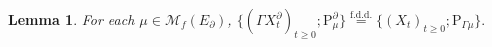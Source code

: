 \documentclass[12pt,a4paper]{amsart}
\numberwithin{equation}{section}
\theoremstyle{plain}
\newtheorem{lem}[thm]{Lemma}
\theoremstyle{definition}
\theoremstyle{remark}
\begin{document}
\begin{lem} \label{thm:T.1}
	For each $\mu \in \mathcal M_f(E_\partial)$,
$
	\{(\Gamma X^\partial_t)_{t\geq 0}; \mathrm P_\mu^\partial\} \overset{\text{f.d.d.}}= \{(X_t)_{t\geq 0}; \mathrm P_{\Gamma\mu}\}.
$
\end{lem}
\begin{comment}
\begin{proof}	
	Fix an arbitrary $\mu\in \mathcal M_f(E_\partial)$, $T\geq 0$, a finite measure $\lambda$ on $[0,T]$, and a bounded non-negative Borel function $f:(s,x)\mapsto f_s(x)$ on $[0,T]\times E$.
	According to \cite[Theorem 5.15]{Li2011Measure-valued}, we know that
\begin{equation} \label{eq:T.05}
\mathrm P_{r,\Gamma\mu}\Big[e^{-\int_{[r,T]} X_{s-r}(f_s)\lambda(\mathrm ds)  } \Big] = e^{-(\Gamma\mu)(u_r)}, \quad 0\leq r\leq T,
\end{equation}
	where $u:(s,x)\mapsto u_s(x)$ is the unique bounded non-negative solution on $[0,T]\times E$ of
\begin{equation} \label{eq:T.1}
	u_r(x) + \int_r^t \Pi_{r, x}\big[\psi\big(\xi_{s-r}, u_s(\xi_{s-r})\big)\mathbf 1_{\xi_{s-r}\in E}\big] \mathrm ds
	= \int_{[r,t]} \Pi_{r, x} \big[f_s(\xi_{s-r}) \mathbf 1_{\xi_{s-r} \in E}\big] \lambda(\mathrm ds).
\end{equation}
	Extend $f$ and $u$ as bounded non-negative functions $f^\partial$ and $u^\partial$ on $[0,T]\times E_\partial$ by setting
\[
	f^\partial_s(x) = f_s(x) \mathbf 1_{x\in E}, \quad u^\partial_s(x) = u_s(x) \mathbf 1_{x\in E},\quad s\in [0,T], x\in E_\partial.
\]
	Now we can verify from \eqref{eq:T.1} that $u^\partial:(s,x)\mapsto u^\partial_s(x)$ is a bounded non-negative solution on $[0,T]\times E_\partial$ of
\begin{equation}
	u_r^\partial(x) + \int_r^t \Pi_{r, x}\big[\psi^\partial\big(\xi_{s-r}, u^\partial_s(\xi_{s-r})\big)\big] \mathrm ds
	= \int_{[r,t]} \Pi_{r, x} \big[f_s^\partial(\xi_{s-r})\big] \lambda(\mathrm ds).
\end{equation}
	From this and \cite[Theorem 5.15]{Li2011Measure-valued}, we have that
\begin{equation} \label{eq:T.15}
	\mathrm P_{r, \mu^\partial} 
	[e^{-\int_{[r,T]} X^\partial_{s-r}(f^\partial_s) \lambda(\mathrm ds)}]
	= e^{-\mu(u^\partial_r)},
	\quad 0\leq r\leq T.
\end{equation}
Thus
\begin{align}
	&\mathrm P_{\Gamma\mu}\Big[e^{-\int_{[0,T]} X_s(f_s)\lambda(\mathrm ds)  } \Big]
	\overset{\eqref{eq:T.05}}= e^{-(\Gamma \mu)(u_0)}
	= e^{-\mu(u_0^\partial)}
	\\&\overset{\eqref{eq:T.15}}= \mathrm P_\mu^\partial \Big[ e^{-\int_{[0,T]} X_s^\partial(f_s^\partial)\lambda(\mathrm ds)} \Big]
	= \mathrm P_\mu^\partial \Big[ e^{-\int_{[0,T]} (\Gamma X_s)(f_s)\lambda(\mathrm ds)} \Big].
\end{align}
	The desired result then follows from this and the fact that $\lambda$ and $f$ have been chosen arbitrarily.
\end{proof}
\end{comment}
\end{document}
